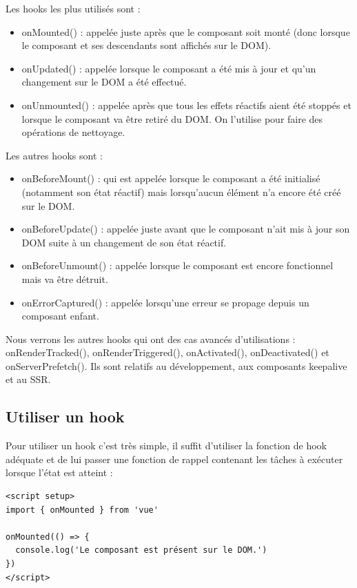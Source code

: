 Les {\color{monOrange}hooks} les plus utilisés sont :
\begin{itemize}
\item {\color{monOrange}onMounted()} : appelée juste après que le composant soit monté (donc lorsque le composant et ses descendants sont affichés sur le DOM).

\item {\color{monOrange}onUpdated()} : appelée lorsque le composant a été mis à jour et qu'un changement sur le DOM a été effectué.

\item {\color{monOrange}onUnmounted()} : appelée après que tous les effets réactifs aient été stoppés et lorsque le composant va être retiré du DOM. On l'utilise pour faire des opérations de nettoyage.
\end{itemize}
Les autres hooks sont :
\begin{itemize}
\item {\color{monOrange}onBeforeMount()} : qui est appelée lorsque le composant a été initialisé (notamment son état réactif) mais lorsqu'aucun élément n'a encore été créé sur le DOM.

\item {\color{monOrange}onBeforeUpdate()} : appelée juste avant que le composant n'ait mis à jour son DOM suite à un changement de son état réactif.

\item {\color{monOrange}onBeforeUnmount()} : appelée lorsque le composant est encore fonctionnel mais va être détruit.

\item {\color{monOrange}onErrorCaptured()} : appelée lorsqu'une erreur se propage depuis un composant enfant.

\end{itemize}

Nous verrons les autres {\color{monOrange}hooks} qui ont des cas avancés d'utilisations : {\color{monOrange} onRenderTracked(), onRenderTriggered(), onActivated(), onDeactivated() et onServerPrefetch()}. Ils sont relatifs au développement, aux composants {\color{monOrange}keepalive} et au {\color{monOrange}SSR}.

\subsection{Utiliser un {\color{monOrange}hook}}
Pour utiliser un hook c'est très simple, il suffit d'utiliser la fonction de {\color{monOrange}hook} adéquate et de lui passer une fonction de rappel contenant les tâches à exécuter lorsque l'état est atteint :
\begin{verbatim}
<script setup>
import { onMounted } from 'vue'

onMounted(() => {
  console.log('Le composant est présent sur le DOM.')
})
</script>
\end{verbatim}

